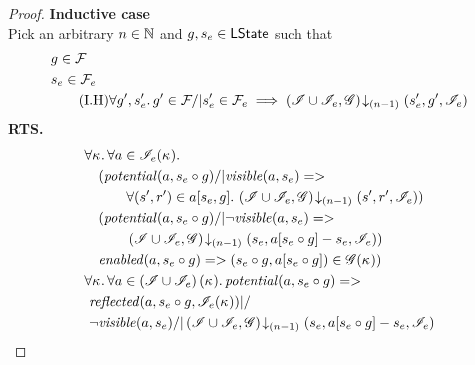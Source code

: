 \begin{lemma}
\begin{proof}
\noindent\textbf{Inductive case }\\
Pick an arbitrary $n \in \mathbb{N}$ and $g, s_e \in \textsf{LState}$ such that
%
\begin{align}
	& g \in  \mathcal{F}_{} \label{LEC:Ass1}\\
	& s_e \in \mathcal{F}_{e} \label{LEC:Ass2}\\
	& \tag{I.H} \forall g', s_e'.\,  g' \in \mathcal{F}_{} /| s'_e \in \mathcal{F}_{e} \implies \left(\mathscr{I} \cup \mathscr{I}_{e}, \mathscr{G}\right) \!\downarrow_{(n-1)} \left(s_e', g', \mathscr{I}_{e}\right) \label{LEC:IH}
\end{align}
%
\textbf{RTS.}
%
\begin{align}
	& 
	\V{\ca{}}  \V{a\in \lmod_e(\ca{})} \nonumber \\
  &\quad (\m{potential}(a, s_e \composeL g) /| \m{visible}(a, s_e) => \nonumber\\
  & \quad\qquad\for{(s', r') \in a[s_e, g]} \extendsAMUpto{\lmod \cup \lmod_e, \gmod}{(n-1)}{s'}{r'}{\lmod_e}) \label{LEC:Goal0}\\
% 
	&\quad (\m{potential}(a, s_e \composeL g) /| \neg\m{visible}(a, s_e) => \nonumber\\
  & \quad\qquad \extendsAMUpto{\lmod \cup \lmod_e, \gmod}{(n-1)}{s_e}{a[s_e \composeL g] - s_e}{\lmod_e}) \label{LEC:Goal1}\\
%   
  &\quad \m{enabled}(a,s_e \composeL g)
  => (s_e \composeL g, a[s_e \composeL g])\in \gmod(\ca{})) \label{LEC:Goal2}\\
%  
  &\V{\ca{}}\V{a\in \left(\lmod \cup \lmod_e \right) (\ca{})}
  \m{potential}(a,s_e \composeL g) =>\null \nonumber \\
  &\ \m{reflected}(a, s_e \composeL g,\lmod_e(\ca{})) |/\null \nonumber \\
%  
  &\ \neg\m{visible}(a, s_e) /| \extendsAMUpto{\lmod \cup \lmod_e, \gmod}{(n-1)}{s_e}{a[s_e \composeL g] - s_e}{\lmod_e}  \label{LEC:Goal3}
\end{align}
%
%


\end{proof}
\end{lemma}
